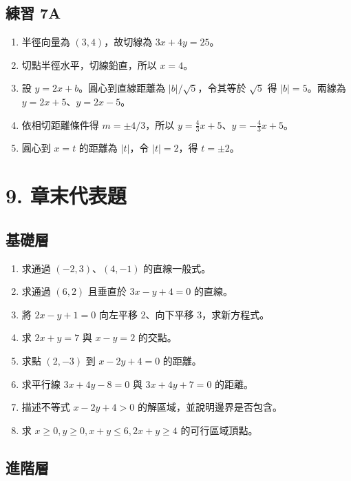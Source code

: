 \documentclass[11pt,a4paper]{article}
\providecommand{\tightlist}{%
  \setlength{\itemsep}{0pt}\setlength{\parskip}{0pt}}
\begin{document}
\subsection{練習 7A}\label{ux7df4ux7fd2-7a-1}

\begin{enumerate}
\def\labelenumi{\arabic{enumi}.}
\tightlist
\item
  半徑向量為 \((3,4)\)，故切線為 \(\boxed{3x+4y=25}\)。
\item
  切點半徑水平，切線鉛直，所以 \(\boxed{x=4}\)。
\item
  設 \(y=2x+b\)。圓心到直線距離為 \(|b|/\sqrt5\)，令其等於 \(\sqrt5\) 得 \(|b|=5\)。兩線為 \(\boxed{y=2x+5}\)、\(\boxed{y=2x-5}\)。
\item
  依相切距離條件得 \(m=\pm4/3\)，所以 \(\boxed{y=\frac43x+5}\)、\(\boxed{y=-\frac43x+5}\)。
\item
  圓心到 \(x=t\) 的距離為 \(|t|\)，令 \(|t|=2\)，得 \(\boxed{t=\pm2}\)。
\end{enumerate}

\section{9. 章末代表題}\label{ux7ae0ux672bux4ee3ux8868ux984c}

\subsection{基礎層}\label{ux57faux790eux5c64}

\begin{enumerate}
\def\labelenumi{\arabic{enumi}.}
\tightlist
\item
  求通過 \((-2,3)\)、\((4,-1)\) 的直線一般式。
\item
  求通過 \((6,2)\) 且垂直於 \(3x-y+4=0\) 的直線。
\item
  將 \(2x-y+1=0\) 向左平移 \(2\)、向下平移 \(3\)，求新方程式。
\item
  求 \(2x+y=7\) 與 \(x-y=2\) 的交點。
\item
  求點 \((2,-3)\) 到 \(x-2y+4=0\) 的距離。
\item
  求平行線 \(3x+4y-8=0\) 與 \(3x+4y+7=0\) 的距離。
\item
  描述不等式 \(x-2y+4>0\) 的解區域，並說明邊界是否包含。
\item
  求 \(x\ge0,y\ge0,x+y\le6,2x+y\ge4\) 的可行區域頂點。
\end{enumerate}

\subsection{進階層}\label{ux9032ux968eux5c64}
\end{document}
